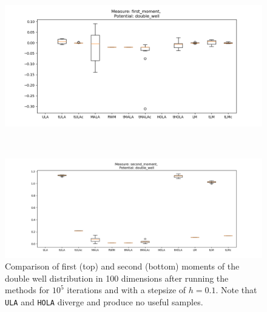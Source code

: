 \begin{figure}
\centering
  \begin{minipage}[b]{0.85\textwidth}
  \centering
    \includegraphics[width=\textwidth]{Figures/doublewell_0_1_10_5samp_100dFirstMoment.png}
  \end{minipage}\\ %
  \begin{minipage}[b]{0.85\textwidth}
  \centering
    \includegraphics[width=\textwidth]{Figures/secondmoment_double_well_100d_10_5samp.png}
  \end{minipage} %
  \caption{Comparison of first (top) and second (bottom) moments of the double well distribution in 100 dimensions after running the methods for \(10^5\) iterations and with a stepsize of \(h=0.1\). Note that \texttt{ULA} and \texttt{HOLA} diverge and produce no useful samples.}
  \label{fig:doubleWell_moment}
  \end{figure}
  
